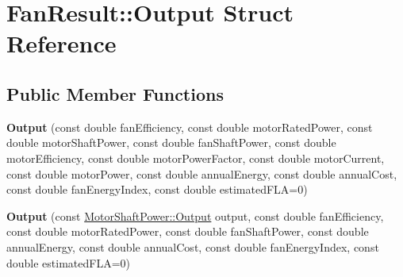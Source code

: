 \hypertarget{struct_fan_result_1_1_output}{}\section{Fan\+Result\+:\+:Output Struct Reference}
\label{struct_fan_result_1_1_output}
\subsection*{Public Member Functions}
\begin{DoxyCompactItemize}
\item 
\mbox{\label{struct_fan_result_1_1_output_ac0fb53ec4c297d359d96a6c992429eb9}} 
{\bfseries Output} (const double fan\+Efficiency, const double motor\+Rated\+Power, const double motor\+Shaft\+Power, const double fan\+Shaft\+Power, const double motor\+Efficiency, const double motor\+Power\+Factor, const double motor\+Current, const double motor\+Power, const double annual\+Energy, const double annual\+Cost, const double fan\+Energy\+Index, const double estimated\+F\+LA=0)
\item 
\mbox{\label{struct_fan_result_1_1_output_acf1dcabe7573dfaf5aa2eadc5e100464}} 
{\bfseries Output} (const \hyperlink{struct_motor_shaft_power_1_1_output}{Motor\+Shaft\+Power\+::\+Output} output, const double fan\+Efficiency, const double motor\+Rated\+Power, const double fan\+Shaft\+Power, const double annual\+Energy, const double annual\+Cost, const double fan\+Energy\+Index, const double estimated\+F\+LA=0)
\end{DoxyCompactItemize}
